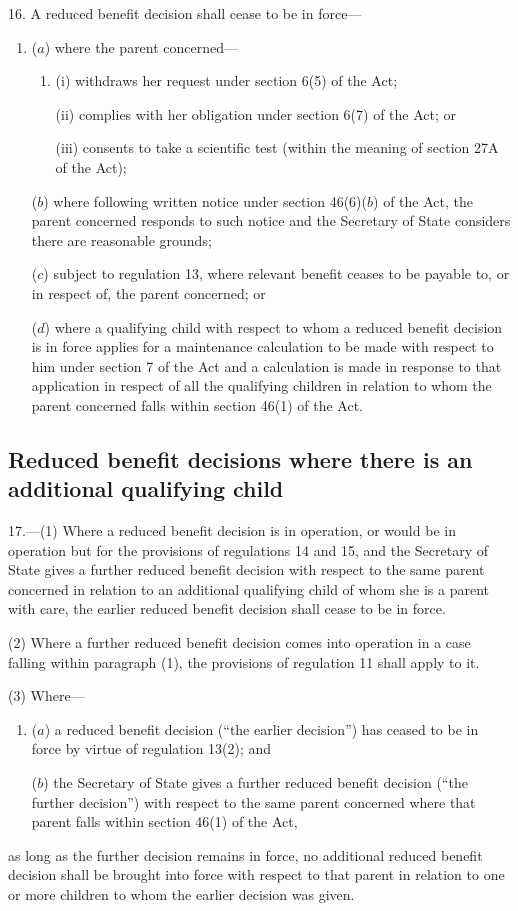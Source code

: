 \documentclass[12pt,a4paper]{article}
\begin{document}
16.  A reduced benefit decision shall cease to be in force—
\begin{enumerate}\item[]
($a$) where the parent concerned—
\begin{enumerate}\item[]
(i) withdraws her request under section 6(5) of the Act;

(ii) complies with her obligation under section 6(7) of the Act; or

(iii) consents to take a scientific test (within the meaning of section 27A of the Act);
\end{enumerate}

($b$) where following written notice under section 46(6)($b$)  of the Act, the parent concerned responds to such notice and the Secretary of State considers there are reasonable grounds;

($c$) subject to regulation 13, where relevant benefit ceases to be payable to, or in respect of, the parent concerned; or

($d$) where a qualifying child with respect to whom a reduced benefit decision is in force applies for a maintenance calculation to be made with respect to him under section 7 of the Act and a calculation is made in response to that application in respect of all the qualifying children in relation to whom the parent concerned falls within section 46(1) of the Act.
\end{enumerate}

\subsection[17. Reduced benefit decisions where there is an additional qualifying child]{Reduced benefit decisions where there is an additional qualifying child}

17.---(1)  Where a reduced benefit decision is in operation, or would be in operation but for the provisions of regulations 14 and 15, and the Secretary of State gives a further reduced benefit decision with respect to the same parent concerned in relation to an additional qualifying child of whom she is a parent with care, the earlier reduced benefit decision shall cease to be in force.

(2) Where a further reduced benefit decision comes into operation in a case falling within paragraph (1), the provisions of regulation 11 shall apply to it.

(3) Where—
\begin{enumerate}\item[]
($a$) a reduced benefit decision (“the earlier decision”) has ceased to be in force by virtue of regulation 13(2); and

($b$) the Secretary of State gives a further reduced benefit decision (“the further decision”) with respect to the same parent concerned where that parent falls within section 46(1) of the Act,
\end{enumerate}
as long as the further decision remains in force, no additional reduced benefit decision shall be brought into force with respect to that parent in relation to one or more children to whom the earlier decision was given.
\end{document}
